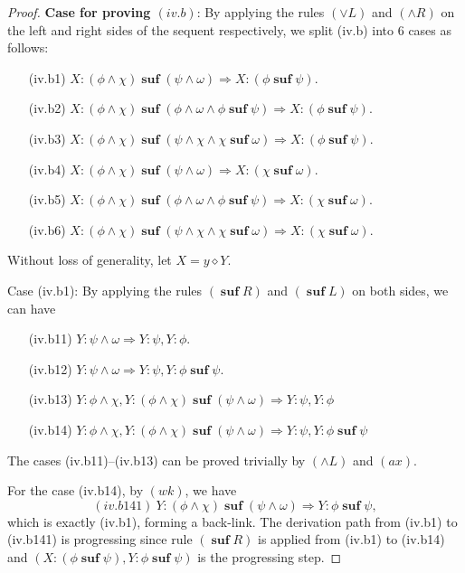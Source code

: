 \documentclass[manuscript,screen]{acmart}
\newcommand{\cat}[0]{\diamond}
\DeclareMathOperator{\osuf}{\mathbf{suf}}
\begin{document}
\begin{proof}
\textbf{Case for proving $(iv.b)$}: 
By applying the rules $(\vee L)$ and $(\wedge R)$ on the left and right sides of the sequent respectively, we split (iv.b) into 6 cases as follows:
\begin{enumerate}
\item[(iv.b1)] $X : (\phi\wedge \chi)\osuf (\psi\wedge \omega)\Rightarrow X : (\phi\osuf \psi)$.
\item[(iv.b2)] $X : (\phi\wedge \chi)\osuf(\phi\wedge \omega\wedge \phi\osuf \psi)\Rightarrow X : (\phi\osuf \psi)$.
\item[(iv.b3)] $X : (\phi\wedge \chi)\osuf (\psi\wedge \chi\wedge \chi\osuf\omega)\Rightarrow X : (\phi\osuf \psi)$.
\item[(iv.b4)] $X : (\phi\wedge \chi)\osuf (\psi\wedge \omega)\Rightarrow X : (\chi\osuf \omega)$.
\item[(iv.b5)] $X : (\phi\wedge \chi)\osuf(\phi\wedge \omega\wedge \phi\osuf \psi)\Rightarrow X : (\chi\osuf \omega)$.
\item[(iv.b6)] $X : (\phi\wedge \chi)\osuf (\psi\wedge \chi\wedge \chi\osuf\omega)\Rightarrow X : (\chi\osuf \omega)$.
\end{enumerate}
Without loss of generality, let $X = y\cat Y$. 

Case (iv.b1): 
By applying the rules $(\osuf R)$ and $(\osuf L)$ on both sides, we can have
\begin{enumerate}
\item[(iv.b11)] $Y : \psi\wedge \omega\Rightarrow Y : \psi, Y : \phi$. 
\item[(iv.b12)] $Y : \psi\wedge \omega\Rightarrow Y : \psi, Y : \phi\osuf \psi$.
\item[(iv.b13)] $Y : \phi\wedge \chi, Y : (\phi\wedge \chi)\osuf(\psi\wedge \omega)\Rightarrow Y : \psi, Y : \phi$
\item[(iv.b14)] $Y : \phi\wedge \chi, Y : (\phi\wedge \chi)\osuf(\psi\wedge \omega)\Rightarrow Y : \psi, Y : \phi\osuf\psi$
\end{enumerate}
The cases (iv.b11)--(iv.b13) can be proved trivially by $(\wedge L)$ and $(ax)$. 

For the case (iv.b14), by $(wk)$, we have
$$
(iv.b141)\ Y : (\phi\wedge\chi)\osuf (\psi\wedge \omega) \Rightarrow Y : \phi\osuf \psi, 
$$
which is exactly (iv.b1), forming a back-link.  
The derivation path from (iv.b1) to (iv.b141) is progressing since rule $(\osuf R)$ is applied from (iv.b1) to (iv.b14) and $(X : (\phi\osuf\psi), Y : \phi\osuf\psi)$ is the progressing step.  


\end{proof}
\end{document}
